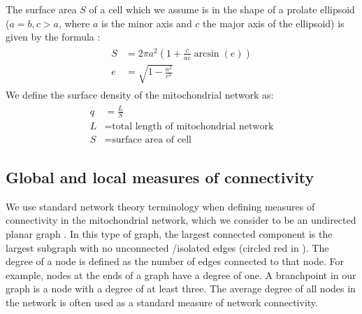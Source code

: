 The surface area $S$ of a cell which we assume is in the shape of a prolate ellipsoid ($a=b, c >a$, where $a$ is the minor axis and $c$ the major axis of the ellipsoid) is given by the formula \cite{olver_nist_2010}:
\begin{equation}
	\begin{split}
		\begin{aligned}
			S&=2\pi a^2 \left( 1+\frac{c}{ae} \arcsin(e)\right) \\[2ex]
			e&=\sqrt{1-\frac{a^2}{c^2}}
		\end{aligned}
	\end{split}
\end{equation}
We define the surface density of the mitochondrial network as:
\begin{equation}\label{eq:surfd}
	\begin{split}
		\begin{aligned}
			q&=\frac{L}{S}\\
			L&=\text{total length of mitochondrial network} \\
			S&=\text{surface area of cell}
		\end{aligned}
	\end{split}
\end{equation}
\subsection{Global and local measures of connectivity}
We use standard network theory terminology when defining measures of connectivity in the mitochondrial network, which we consider to be an undirected planar graph \cite{west2001introduction}. In this type of graph, the largest connected component is the largest subgraph with no unconnected /isolated edges (circled red in ). The degree of a node is defined as the number of edges connected to that node. For example, nodes at the ends of a graph have a degree of one. A branchpoint in our graph is a node with a degree of at least three. The average degree of all nodes in the network is often used as a standard measure of network connectivity.


